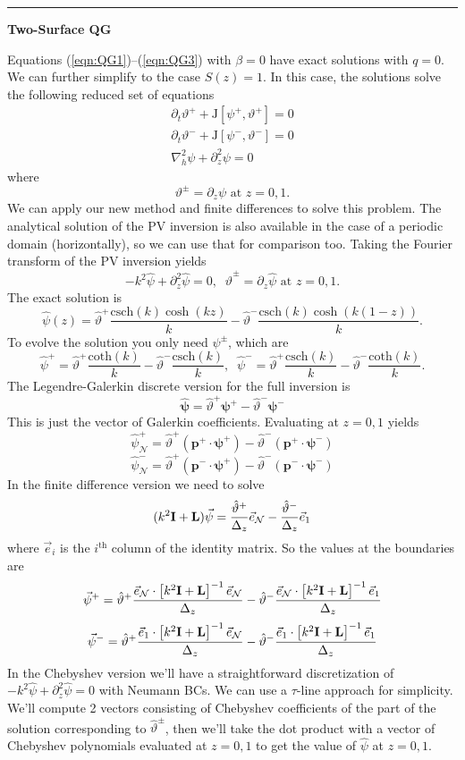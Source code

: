 \documentclass[10pt]{article}
\newcommand{\pd}[1]{\partial_{#1}}
\newcommand{\tJ}{\text{J}}
\newcommand{\sN}{\mathcal{N}}
\newcommand{\mat}[1]{\text{\bf #1}}
\begin{document}
\hrule
\begin{center}{\bf Two-Surface QG}\end{center}
Equations (\ref{eqn:QG1})--(\ref{eqn:QG3}) with $\beta=0$ have exact solutions with $q=0$.
We can further simplify to the case $S(z) = 1$.
In this case, the solutions solve the following reduced set of equations
\begin{gather}
\pd{t}\vartheta^+ + \tJ[\psi^+,\vartheta^+] = 0\\
\pd{t}\vartheta^-+ \tJ[\psi^-,\vartheta^-] = 0\\
\nabla_h^2\psi + \pd{z}^2\psi = 0
\end{gather}
where 
\begin{equation}
\vartheta^\pm= \pd{z}\psi\text{ at }z=0,1.
\end{equation}
We can apply our new method and finite differences to solve this problem.
The analytical solution of the PV inversion is also available in the case of a periodic domain (horizontally), so we can use that for comparison too.
Taking the Fourier transform of the PV inversion yields
\[-k^2\hat{\psi}+\pd{z}^2\hat{\psi} = 0,\;\;\hat{\vartheta}^\pm = \pd{z}\hat{\psi}\text{ at }z=0,1.\]
The exact solution is
\[\hat{\psi}(z) = \hat{\vartheta}^+\frac{\text{csch}(k)\cosh(kz)}{k}-\hat{\vartheta}^-\frac{\text{csch}(k)\cosh(k(1-z))}{k}.\]
To evolve the solution you only need $\psi^\pm$, which are
\[\hat{\psi}^+ = \hat{\vartheta}^+\frac{\text{coth}(k)}{k}-\hat{\vartheta}^-\frac{\text{csch}(k)}{k},\;\;\hat{\psi}^- = \hat{\vartheta}^+\frac{\text{csch}(k)}{k}-\hat{\vartheta}^-\frac{\text{coth}(k)}{k}.\]
The Legendre-Galerkin discrete version for the full inversion is
\[\hat{\bm{\psi}} = \hat{\vartheta}^+\bm{\psi}^+-\hat{\vartheta}^-\bm{\psi}^-\]
This is just the vector of Galerkin coefficients.
Evaluating at $z=0,1$ yields
\[\hat{\psi}_\sN^+ = \hat{\vartheta}^+(\bm{p}^+\cdot\bm{\psi}^+) - \hat{\vartheta}^-(\bm{p}^+\cdot\bm{\psi}^-)\]
\[\hat{\psi}_\sN^- = \hat{\vartheta}^+(\bm{p}^-\cdot\bm{\psi}^+) - \hat{\vartheta}^-(\bm{p}^-\cdot\bm{\psi}^-)\]
In the finite difference version we need to solve
\[(k^2\mat{I}+\mat{L})\vec{\psi} = \frac{\hat{\vartheta}^+}{\Delta_z}\vec{e}_\sN - \frac{\hat{\vartheta}^-}{\Delta_z}\vec{e}_1\]
where $\vec{e}_i$ is the $i^\text{th}$ column of the identity matrix.
So the values at the boundaries are
\[\vec{\psi}^+ = \hat{\vartheta}^+\frac{\vec{e}_\sN\cdot\left[k^2\mat{I}+\mat{L}\right]^{-1}\vec{e}_{\sN}}{\Delta_z} - \hat{\vartheta}^-\frac{\vec{e}_\sN\cdot\left[k^2\mat{I}+\mat{L}\right]^{-1}\vec{e}_{1}}{\Delta_z}\]
\[\vec{\psi}^- = \hat{\vartheta}^+\frac{\vec{e}_1\cdot\left[k^2\mat{I}+\mat{L}\right]^{-1}\vec{e}_{\sN}}{\Delta_z} - \hat{\vartheta}^-\frac{\vec{e}_1\cdot\left[k^2\mat{I}+\mat{L}\right]^{-1}\vec{e}_{1}}{\Delta_z}\]
In the Chebyshev version we'll have a straightforward discretization of $-k^2\hat{\psi}+\pd{z}^2\hat{\psi} = 0$ with Neumann BCs.
We can use a $\tau$-line approach for simplicity.
We'll compute 2 vectors consisting of Chebyshev coefficients of the part of the solution corresponding to $\hat{\vartheta}^\pm$, then we'll take the dot product with a vector of Chebyshev polynomials evaluated at $z=0,1$ to get the value of $\hat{\psi}$ at $z=0,1$.\\
\end{document}
